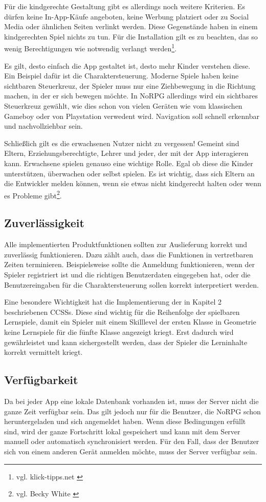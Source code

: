 		Für die kindgerechte Gestaltung gibt es allerdings noch weitere Kriterien. Es dürfen keine In-App-Käufe angeboten, keine Werbung platziert oder zu Social Media oder ähnlichen Seiten verlinkt werden. Diese Gegenstände haben in einem kindgerechten Spiel nichts zu tun. Für die Installation gilt es zu beachten, das so wenig Berechtigungen wie notwendig verlangt werden\footnote{vgl. klick-tipps.net \cite{appsforkids}}.
		
		Es gilt, desto einfach die App gestaltet ist, desto mehr Kinder verstehen diese. Ein Beispiel dafür ist die Charaktersteuerung. Moderne Spiele haben keine sichtbaren Steuerkreuz, der Spieler muss nur eine Ziehbewegung in die Richtung machen, in der er sich bewegen möchte. In NoRPG allerdings wird ein sichtbares Steuerkreuz gewählt, wie dies schon von vielen Geräten wie vom klassischen Gameboy oder von Playstation verwedent wird. Navigation soll schnell erkennbar und nachvollziehbar sein.
		
		Schließlich gilt es die erwachsenen Nutzer nicht zu vergessen! Gemeint sind Eltern, Erziehungsberechtigte, Lehrer und jeder, der mit der App interagieren kann. Erwachsene spielen genauso eine wichtige Rolle. Egal ob diese die Kinder unterstützen, überwachen oder selbst spielen. Es ist wichtig, dass sich Eltern an die Entwickler melden können, wenn sie etwas nicht kindgerecht halten oder wenn es Probleme gibt\footnote{vgl. Becky White \cite{smashMagazin}}.	

	\subsection{Zuverlässigkeit}
		Alle implementierten Produktfunktionen sollten zur Auslieferung korrekt und zuverlässig funktionieren. Dazu zählt auch, dass die Funktionen in vertretbaren Zeiten terminieren. Beispielsweise sollte die Anmeldung funktionieren, wenn der Spieler registriert ist und die richtigen Benutzerdaten eingegeben hat, oder die Benutzereingaben für die Charaktersteuerung sollen korrekt interpretiert werden.
		
		Eine besondere Wichtigkeit hat die Implementierung der in Kapitel 2 beschriebenen \acp{CCSS}. Diese sind wichtig für die Reihenfolge der spielbaren Lernspiele, damit ein Spieler mit einem Skilllevel der ersten Klasse in Geometrie keine Lernspiele für die fünfte Klasse angezeigt kriegt. Erst dadurch wird gewährleistet und kann sichergestellt werden, dass der Spieler die Lerninhalte korrekt vermittelt kriegt.
	
	\subsection{Verfügbarkeit}
		Da bei jeder App eine lokale Datenbank vorhanden ist, muss der Server nicht die ganze Zeit verfügbar sein. Das gilt jedoch nur für die Benutzer, die NoRPG schon heruntergeladen und sich angemeldet haben. Wenn diese Bedingungen erfüllt sind, wird der ganze Fortschritt lokal gespeichert und kann mit dem Server manuell oder automatisch synchronisiert werden. Für den Fall, dass der Benutzer sich von einem anderen Gerät anmelden möchte, muss der Server verfügbar sein.
		
